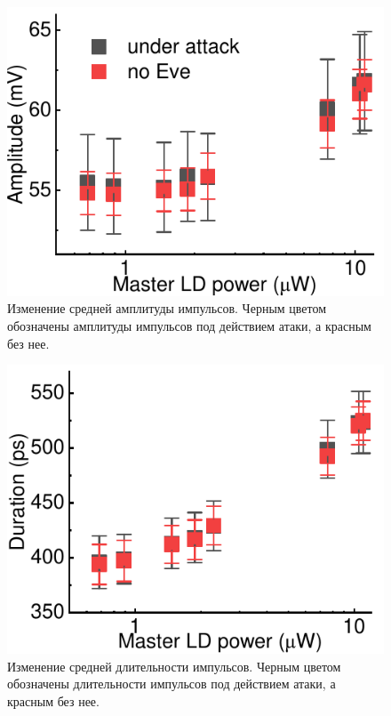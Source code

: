 \begin{figure}%
	\centering
	\includegraphics[width=\linewidth]{images/amplitude_change.pdf}
	\caption{Изменение средней амплитуды импульсов. Черным цветом обозначены амплитуды импульсов под действием атаки, а красным без нее.}
	\label{fig:amplitude}
\end{figure}


\begin{figure}%
	\includegraphics[width=\linewidth]{images/duration_change.pdf}
	\caption{Изменение средней длительности импульсов. Черным цветом обозначены длительности импульсов под действием атаки, а красным без нее.}
	\label{fig:duration}
\end{figure}


